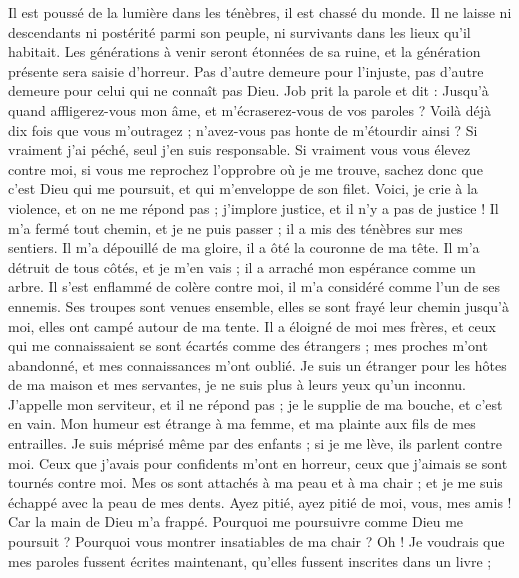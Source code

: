 \begin{multicols}{2}
Il est poussé de la lumière dans les ténèbres, il est chassé du monde.
Il ne laisse ni descendants ni postérité parmi son peuple, ni survivants dans les lieux qu'il habitait.
Les générations à venir seront étonnées de sa ruine, et la génération présente sera saisie d'horreur.
Pas d'autre demeure pour l'injuste, pas d'autre demeure pour celui qui ne connaît pas Dieu.
\VerseOne{}Job prit la parole et dit :
Jusqu'à quand affligerez-vous mon âme, et m'écraserez-vous de vos paroles ?
Voilà déjà dix fois que vous m'outragez ; n'avez-vous pas honte de m'étourdir ainsi ?
Si vraiment j'ai péché, seul j'en suis responsable.
Si vraiment vous vous élevez contre moi, si vous me reprochez l'opprobre où je me trouve,
sachez donc que c'est Dieu qui me poursuit, et qui m'enveloppe de son filet.
Voici, je crie à la violence, et on ne me répond pas ; j'implore justice, et il n'y a pas de justice !
Il m'a fermé tout chemin, et je ne puis passer ; il a mis des ténèbres sur mes sentiers.
Il m'a dépouillé de ma gloire, il a ôté la couronne de ma tête.
Il m'a détruit de tous côtés, et je m'en vais ; il a arraché mon espérance comme un arbre.
Il s'est enflammé de colère contre moi, il m'a considéré comme l'un de ses ennemis.
Ses troupes sont venues ensemble, elles se sont frayé leur chemin jusqu'à moi, elles ont campé autour de ma tente.
Il a éloigné de moi mes frères, et ceux qui me connaissaient se sont écartés comme des étrangers ;
mes proches m'ont abandonné, et mes connaissances m'ont oublié.
Je suis un étranger pour les hôtes de ma maison et mes servantes, je ne suis plus à leurs yeux qu'un inconnu.
J'appelle mon serviteur, et il ne répond pas ; je le supplie de ma bouche, et c'est en vain.
Mon humeur est étrange à ma femme, et ma plainte aux fils de mes entrailles.
Je suis méprisé même par des enfants ; si je me lève, ils parlent contre moi.
Ceux que j'avais pour confidents m'ont en horreur, ceux que j'aimais se sont tournés contre moi.
Mes os sont attachés à ma peau et à ma chair ; et je me suis échappé avec la peau de mes dents.
Ayez pitié, ayez pitié de moi, vous, mes amis ! Car la main de Dieu m'a frappé.
Pourquoi me poursuivre comme Dieu me poursuit ? Pourquoi vous montrer insatiables de ma chair ?
Oh ! Je voudrais que mes paroles fussent écrites maintenant, qu'elles fussent inscrites dans un livre ;

\end{multicols}
